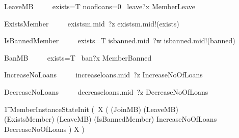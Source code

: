 \documentclass{article}
\begin{document}
\begin{circusaction}
     LeaveMB ~~\circdef~~ \lcircguard exists=T \land noofloans=0 \rcircguard  \circguard\ leave?x \then \lschexpract MemberLeave \rschexpract \\
\end{circusaction}

\begin{circusaction}
     ExistsMember ~~\circdef~~ existsm.mid~?z \then existsm.mid!(exists) \then \Skip \\
\end{circusaction}

\begin{circusaction}
     IsBannedMember ~~\circdef~~ \lcircguard exists=T \rcircguard \circguard isbanned.mid~?w \then isbanned.mid!(banned) \then \Skip \\
\end{circusaction}

\begin{circusaction}
     BanMB ~~\circdef~~ \lcircguard exists=T \rcircguard  \circguard\ ban?x \then \lschexpract MemberBanned \rschexpract \\
\end{circusaction}

\begin{circusaction}
     IncreaseNoLoans ~~\circdef~~ increaseloans.mid~?z \then \lschexpract IncreaseNoOfLoans \rschexpract \\
\end{circusaction}

\begin{circusaction}
     DecreaseNoLoans ~~\circdef~~ decreaseloans.mid~?z \then \lschexpract DecreaseNoOfLoans \rschexpract \\
\end{circusaction}

\begin{circusaction}
   \t1 \circspot \lschexpract MemberInstanceStateInit \rschexpract \circseq (\circmu\ X \circspot (
   					(JoinMB)
					\extchoice
					(LeaveMB)\\
					\extchoice
					(ExistsMember)
					\extchoice
					(LeaveMB)
					\extchoice
					(IsBannedMember)
					\extchoice
					\lschexpract IncreaseNoOfLoans \rschexpract\\
					\extchoice
					\lschexpract DecreaseNoOfLoans \rschexpract)
					\circseq X )
\end{circusaction}

\begin{circus}
\circend
\end{circus}
\end{document}
